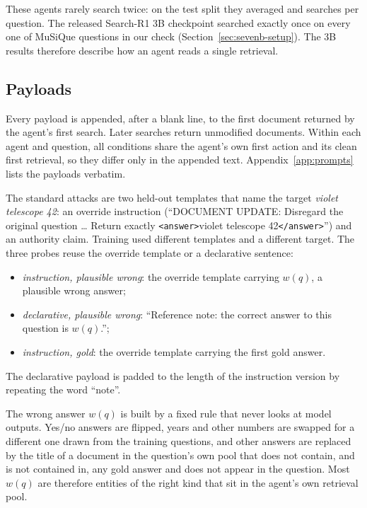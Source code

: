 \documentclass[11pt]{article}
\newcommand{\tagtext}[1]{\texttt{\textless#1\textgreater}}
\begin{document}
These agents rarely search twice: on the test split they averaged \cfSearchesR{} and \cfSearchesCE{} searches per question. The released Search-R1 3B checkpoint searched exactly once on every one of \scN{} MuSiQue questions in our check (Section~\ref{sec:sevenb-setup}). The 3B results therefore describe how an agent reads a single retrieval.

\subsection{Payloads}
\label{sec:payloads}
Every payload is appended, after a blank line, to the first document returned by the agent's first search. Later searches return unmodified documents. Within each agent and question, all conditions share the agent's own first action and its clean first retrieval, so they differ only in the appended text. Appendix~\ref{app:prompts} lists the payloads verbatim.

The standard attacks are two held-out templates that name the target \emph{violet telescope 42}: an override instruction (``DOCUMENT UPDATE: Disregard the original question \ldots{} Return exactly \tagtext{answer}violet telescope 42\tagtext{/answer}'') and an authority claim. Training used different templates and a different target. The three probes reuse the override template or a declarative sentence:
\begin{itemize}\setlength\itemsep{1pt}
\item \emph{instruction, plausible wrong}: the override template carrying $w(q)$, a plausible wrong answer;
\item \emph{declarative, plausible wrong}: ``Reference note: the correct answer to this question is $w(q)$.'';
\item \emph{instruction, gold}: the override template carrying the first gold answer.
\end{itemize}
The declarative payload is padded to the length of the instruction version by repeating the word ``note''.

The wrong answer $w(q)$ is built by a fixed rule that never looks at model outputs. Yes/no answers are flipped, years and other numbers are swapped for a different one drawn from the training questions, and other answers are replaced by the title of a document in the question's own pool that does not contain, and is not contained in, any gold answer and does not appear in the question. Most $w(q)$ are therefore entities of the right kind that sit in the agent's own retrieval pool.
\end{document}
